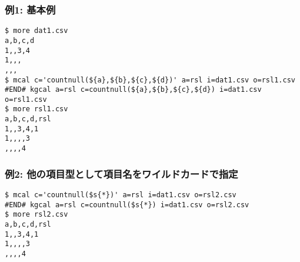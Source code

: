 \subsubsection*{例1: 基本例}



\begin{Verbatim}[baselinestretch=0.7,frame=single]
$ more dat1.csv
a,b,c,d
1,,3,4
1,,,
,,,
$ mcal c='countnull(${a},${b},${c},${d})' a=rsl i=dat1.csv o=rsl1.csv
#END# kgcal a=rsl c=countnull(${a},${b},${c},${d}) i=dat1.csv o=rsl1.csv
$ more rsl1.csv
a,b,c,d,rsl
1,,3,4,1
1,,,,3
,,,,4
\end{Verbatim}
\subsubsection*{例2: 他の項目型として項目名をワイルドカードで指定}



\begin{Verbatim}[baselinestretch=0.7,frame=single]
$ mcal c='countnull($s{*})' a=rsl i=dat1.csv o=rsl2.csv
#END# kgcal a=rsl c=countnull($s{*}) i=dat1.csv o=rsl2.csv
$ more rsl2.csv
a,b,c,d,rsl
1,,3,4,1
1,,,,3
,,,,4
\end{Verbatim}
